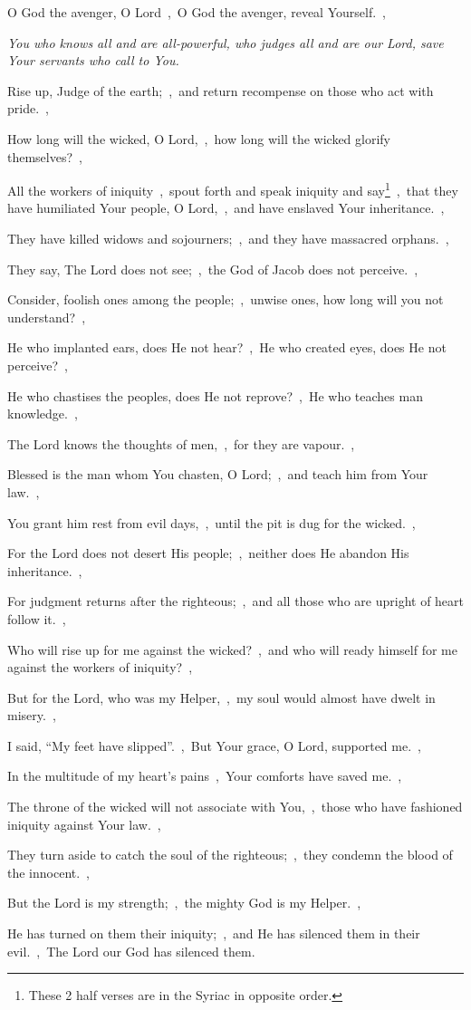 \documentclass[12pt,twoside,a5paper]{article}
\newcommand{\qanona}[1]{{\liturgicalhint{Qanona.} \emph{#1}}}
\begin{document}
\begin{normalparskip}
  O God the avenger, O Lord~\sep\ O God the avenger, reveal Yourself.~\sep

  \qanona{You who knows all and are all-powerful, who judges all and are our Lord, save Your servants who call to You.}

  Rise up, Judge of the earth;~\sep\ and return recompense on those who act with pride.~\sep

  How long will the wicked, O Lord,~\sep\ how long will the wicked glorify themselves?~\sep

  All the workers of iniquity~\sep\ spout forth and speak iniquity and say\footnote{These 2 half verses are in the Syriac in opposite order.}~\sep\ that they have humiliated Your people, O Lord,~\sep\ and have enslaved Your inheritance.~\sep

  They have killed widows and sojourners;~\sep\ and they have massacred orphans.~\sep

  They say, The Lord does not see;~\sep\ the God of Jacob does not perceive.~\sep

  Consider, foolish ones among the people;~\sep\ unwise ones, how long will you not understand?~\sep

  He who implanted ears, does He not hear?~\sep\ He who created eyes, does He not perceive?~\sep

  He who chastises the peoples, does He not reprove?~\sep\ He who teaches man knowledge.~\sep

  The Lord knows the thoughts of men,~\sep\ for they are vapour.~\sep

  Blessed is the man whom You chasten, O Lord;~\sep\ and teach him from Your law.~\sep

  You grant him rest from evil days,~\sep\ until the pit is dug for the wicked.~\sep

  For the Lord does not desert His people;~\sep\ neither does He abandon His inheritance.~\sep

  For judgment returns after the righteous;~\sep\ and all those who are upright of heart follow it.~\sep

  Who will rise up for me against the wicked?~\sep\ and who will ready himself for me against the workers of iniquity?~\sep

  But for the Lord, who was my Helper,~\sep\ my soul would almost have dwelt in misery.~\sep

  I said, ``My feet have slipped''.~\sep\ But Your grace, O Lord, supported me.~\sep

  In the multitude of my heart's pains~\sep\ Your comforts have saved me.~\sep

  The throne of the wicked will not associate with You,~\sep\ those who have fashioned iniquity against Your law.~\sep

  They turn aside to catch the soul of the righteous;~\sep\ they condemn the blood of the innocent.~\sep

  But the Lord is my strength;~\sep\ the mighty God is my Helper.~\sep

  He has turned on them their iniquity;~\sep\ and He has silenced them in their evil.~\sep\ The Lord our God has silenced them.
\end{normalparskip}
\end{document}
